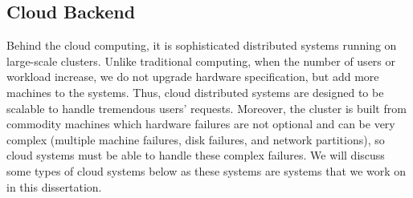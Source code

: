 \subsection{Cloud Backend}

Behind the cloud computing, it is sophisticated distributed systems running on
large-scale clusters. Unlike traditional computing, when the number of users or
workload increase, we do not upgrade hardware specification, but add more
machines to the systems. Thus, cloud distributed systems are designed to be
scalable to handle tremendous users' requests. Moreover, the cluster is built
from commodity machines which hardware failures are not optional and can be very
complex (\eg multiple machine failures, disk failures, and network partitions),
so cloud systems must be able to handle these complex failures.
We will discuss some types of cloud systems below as these systems are
systems that we work on in this dissertation.

